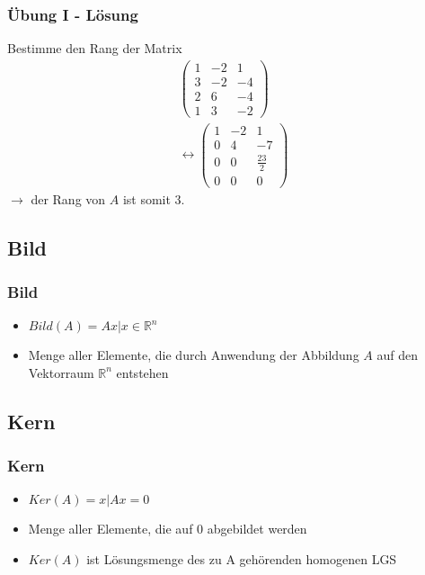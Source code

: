 \begin{frame}
	\frametitle{Übung I - Lösung}
	Bestimme den Rang der Matrix
	\begin{align*}
		\begin{pmatrix}
			1 & -2 & 1 \\
			3 & -2 & -4 \\
			2 & 6 & -4 \\
			1 & 3 & -2 
		\end{pmatrix} \\
		\leftrightarrow
		\begin{pmatrix}
			1 & -2 & 1 \\
			0 & 4 & -7 \\
			0 & 0 & \frac{23}{2} \\
			0 & 0 & 0
		\end{pmatrix} 
	\end{align*}
	$\rightarrow$ der Rang von $A$ ist somit $3$.
\end{frame}


\subsection{Bild}
\begin{frame}
    \frametitle{Bild}
    \begin{itemize}
        \item $Bild(A)={Ax | x\in \mathbb{R}^n}$
        \item Menge aller Elemente, die durch Anwendung der Abbildung $A$ auf den Vektorraum $\mathbb{R}^n$ entstehen
    \end{itemize}
\end{frame}

\subsection{Kern}
\begin{frame}
    \frametitle{Kern}
    \begin{itemize}
        \item $Ker(A)={x | Ax=0}$
        \item Menge aller Elemente, die auf 0 abgebildet werden
        \item $Ker(A)$ ist Lösungsmenge des zu A gehörenden homogenen LGS
    \end{itemize}
\end{frame}

